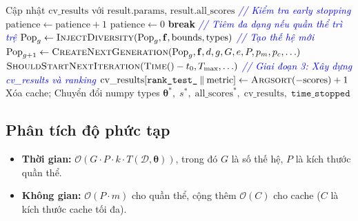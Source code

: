 \documentclass[12pt,a4paper]{article}
\begin{document}
\begin{algorithm}[H]
\begin{algorithmic}[1]
        \EndIf
        \State Cập nhật $\text{cv\_results}$ với $\text{result.params}$, $\text{result.all\_scores}$
    \EndFor
    \Statex \textcolor{blue}{\textit{\quad// Kiểm tra early stopping}}
        \State $\text{patience} \gets \text{patience} + 1$
    \Else
        \State $\text{patience} \gets 0$
    \EndIf
        \State \textbf{break} 
    \EndIf
    \Statex \textcolor{blue}{\textit{\quad// Tiêm đa dạng nếu quần thể trì trệ}}
        \State $\text{Pop}_g \gets \textsc{InjectDiversity}(\text{Pop}_g, \mathbf{f}, \text{bounds}, \text{types})$
    \EndIf
    \Statex \textcolor{blue}{\textit{\quad// Tạo thế hệ mới}}
    \State $\text{Pop}_{g+1} \gets \textsc{CreateNextGeneration}(\text{Pop}_g, \mathbf{f}, d, g, G, e, P, p_m, p_c, \ldots)$
    \State $\textsc{ShouldStartNextIteration}(\textsc{Time}() - t_0, T_{\max}, \ldots)$ 
\EndFor
\Statex \textcolor{blue}{\textit{// Giai đoạn 3: Xây dựng cv\_results và ranking}}
    \State $\text{cv\_results}[\texttt{rank\_test\_} \mathbin{\Vert} \text{metric}] \gets \textsc{Argsort}(-\text{scores}) + 1$
\EndFor
\State Xóa cache; Chuyển đổi numpy types
\State \Return $\boldsymbol{\theta}^*,\; s^*,\; \text{all\_scores}^*,\; \text{cv\_results},\; \texttt{time\_stopped}$
\end{algorithmic}
\end{algorithm}

\subsection{Phân tích độ phức tạp}

\begin{itemize}
    \item \textbf{Thời gian:}
    $\mathcal{O}\!\left(G \cdot P \cdot k \cdot T(\mathcal{D}, \boldsymbol{\theta})\right)$,
    trong đó $G$ là số thế hệ, $P$ là kích thước quần thể.

    \item \textbf{Không gian:}
    $\mathcal{O}(P \cdot m)$ cho quần thể, cộng thêm
    $\mathcal{O}(C)$ cho cache ($C$ là kích thước cache tối đa).
\end{itemize}

\newpage
\end{document}
